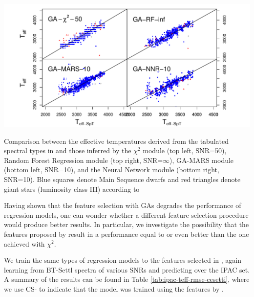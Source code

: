 \begin {figure*}
\centering \includegraphics[width=\textwidth]{figs/ipac-teff.pdf}
\caption{Comparison
 between the effective temperatures derived from the tabulated
 spectral types in \protect\cite{cesetti} and those inferred by the
 $\chi^2$ module (top left, SNR=50), Random Forest Regression module
 (top right, SNR=$\infty$), GA-MARS module (bottom left, SNR=10), and
 the Neural Network module (bottom right, SNR=10).  Blue squares
 denote Main Sequence dwarfs and red triangles denote giant stars
 (luminosity class III) according
 to \protect\cite{cesetti}} \label{fig:ipac_teff}
\end {figure*}


Having shown that the feature selection with GAs degrades the
performance of regression models, one can wonder whether a different
feature selection procedure would produce better results. In
particular, we investigate the possibility that the features proposed
by \cite{cesetti} result in a performance equal to or even better than
the one achieved with $\chi^2$.

We train the same types of regression models to the features selected
in \cite{cesetti}, again learning from BT-Settl spectra of various
SNRs and predicting over the IPAC set. A summary of the results can be
found in Table \ref{tab:ipac-teff-rmse-cesetti}, where we use CS- to
indicate that the model was trained using the features
by \cite{cesetti}. 

